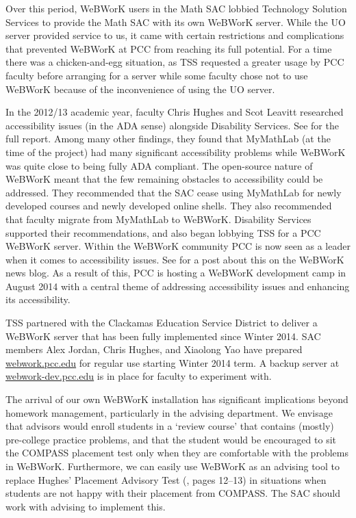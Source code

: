 Over this period, WeBWorK users in the Math SAC lobbied Technology Solution
Services to provide the Math SAC with its own WeBWorK server. While the UO
server provided service to us, it came with certain restrictions and
complications that prevented WeBWorK at PCC from reaching its full potential.
For a time there was a chicken-and-egg situation, as TSS requested a greater
usage by PCC faculty before arranging for a server while some faculty chose not
to use WeBWorK because of the inconvenience of using the UO server.

In the 2012/13 academic year, faculty Chris Hughes and Scot Leavitt researched
accessibility issues (in the ADA sense) alongside Disability Services. See
\cite{accessibilityproject} for the full report. Among many other findings, they
found that MyMathLab (at the time of the project) had many significant
accessibility problems while WeBWorK was quite close to being fully ADA
compliant. The open-source nature of WeBWorK meant that the few remaining
obstacles to accessibility could be addressed. They recommended that the SAC
cease using MyMathLab for newly developed courses and newly developed online
shells. They also recommended that faculty migrate from MyMathLab to WeBWorK.
Disability Services supported their recommendations, and also began lobbying TSS
for a PCC WeBWorK server. Within the WeBWorK community PCC is now seen as a
leader when it comes to accessibility issues. See \cite{webworkblog} for a post
about this on the WeBWorK news blog. As a result of this, PCC is hosting a
WeBWorK development camp in August 2014 with a central theme of addressing
accessibility issues and enhancing its accessibility.\label{other:page:disabilityservices}

TSS partnered with the Clackamas Education Service District to deliver a WeBWorK
server that has been fully implemented since Winter 2014.  SAC members Alex Jordan,
Chris Hughes, and Xiaolong Yao have prepared
\href{http://webwork.pcc.edu}{webwork.pcc.edu} for regular use starting Winter
2014 term. A backup server at
\href{http://webwork-dev.pcc.edu}{webwork-dev.pcc.edu} is in place for faculty
to experiment with.

The arrival of our own WeBWorK installation has significant implications beyond
homework management, particularly in the advising department. We envisage that
advisors would enroll students in a `review course' that contains (mostly)
pre-college practice problems, and that the student would be encouraged to sit
the COMPASS placement test only when they are comfortable with the problems in
WeBWorK. Furthermore, we can easily use WeBWorK as an advising tool to replace
Hughes' Placement Advisory Test (\cite{mathprogramreview2003}, pages 12--13) in
situations when students are not happy with
their placement from COMPASS.  The SAC should work with advising to implement
this.

